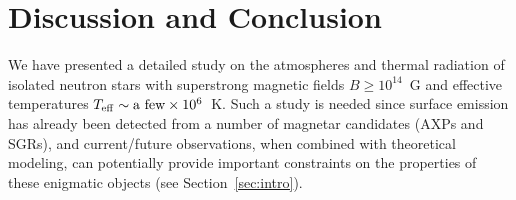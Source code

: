 \documentclass{mn2e}
\newcommand{\Teff}{T_{\rm eff}}
\begin{document}
{{\setcounter{equation}{0}
\section{Discussion and Conclusion}
\label{sec:discussion}

We have presented a detailed study on the atmospheres
and thermal radiation of isolated neutron stars with superstrong
magnetic fields $B\ge 10^{14}$~G and effective temperatures
$\Teff\sim \mbox{a few}\times 10^6$~K.
Such a study is needed since surface emission has already been
detected from a number of magnetar candidates (AXPs and SGRs),
and current/future observations, when combined with theoretical modeling,
can potentially provide important constraints on the properties of these
enigmatic objects (see Section~\ref{sec:intro}).

}}
\end{document}
